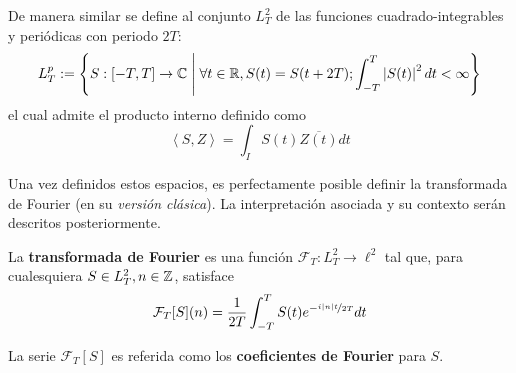 De manera similar se define al conjunto $L^{2}_T$ de las funciones cuadrado-integrables y periódicas con periodo $2T$:
\begin{equation}
L^{p}_T := \left\{ S: [-T,T]\rightarrow\mathbb{C} \mathrel{}\middle|\mathrel{} \forall t\in \mathbb{R}, S(t) = S(t+2T) ;  \int_{-T}^{T} \left| S(t) \right|^{2} dt < \infty \right\}
\end{equation}
el cual admite el producto interno definido como
\begin{equation}
\left\langle S,Z \right\rangle = \int_I S(t) \overline{Z(t)} dt
\end{equation}

%




Una vez definidos estos espacios, es perfectamente posible definir la transformada de Fourier (en su \textit{versión clásica}). 
%
La interpretación asociada y su contexto serán descritos posteriormente.

\begin{definicion}
La \textbf{transformada de Fourier} es una función $\mathcal{F}_T : L^{2}_T \rightarrow \ell^{2}$ tal que, para cualesquiera $S\in L^{2}_T, n\in \mathbb{Z}$, satisface
\begin{equation}
\mathcal{F}_T[S](n) = \frac{1}{2 T} \int_{- T }^{ T } S(t) e^{-\nicefrac{ i \left| n \right| t}{2T}} dt
\end{equation}

La serie $\mathcal{F}_T[S]$ es referida como los \textbf{coeficientes de Fourier} para $S$.
\end{definicion}

